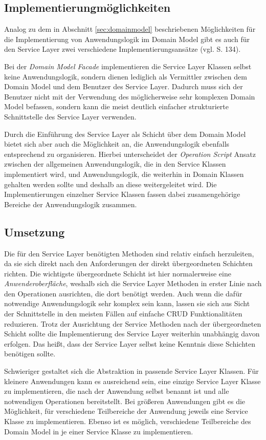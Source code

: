\subsection{Implementierungmöglichkeiten}
Analog zu dem in Abschnitt \ref{sec:domainmodel} beschriebenen Möglichkeiten für
die Implementierung von Anwendungslogik im Domain Model gibt es auch für den
Service Layer zwei verschiedene Implementierungsansätze (vgl.
\cite{fowler:2002} S. 134).

Bei der \emph{Domain Model Facade} implementieren die Service Layer Klassen
selbst keine Anwendungslogik, sondern dienen lediglich als Vermittler zwischen
dem Domain Model und dem Benutzer des Service Layer. Dadurch muss sich der
Benutzer nicht mit der Verwendung des möglicherweise sehr komplexen Domain Model
befassen, sondern kann die meist deutlich einfacher strukturierte
Schnittstelle des Service Layer verwenden.

Durch die Einführung des Service Layer als Schicht über dem Domain Model bietet
sich aber auch die Möglichkeit an, die Anwendungslogik ebenfalls entsprechend zu
organisieren. Hierbei unterscheidet der \emph{Opera\-tion Script} Ansatz
zwischen der allgemeinen Anwendungslogik, die in den Service Klassen implementiert wird,
und Anwendungslogik, die weiterhin in Domain Klassen gehalten werden sollte und
deshalb an diese weitergeleitet wird. Die Implementierungen einzelner Service
Klassen fassen dabei zusamengehörige Bereiche der Anwendungslogik zusammen.

\subsection{Umsetzung}
Die für den Service Layer benötigten Methoden sind relativ einfach herzuleiten,
da sie sich direkt nach den Anforderungen der direkt übergeordneten Schichten
richten. Die wichtigste übergeordnete Schicht ist hier normalerweise eine
\emph{Anwenderoberfläche}, weshalb sich die Service Layer Methoden in erster
Linie nach den Operationen ausrichten, die dort benötigt werden. Auch wenn die
dafür notwendige Anwendungslogik sehr komplex sein kann, lassen sie sich aus
Sicht der Schnittstelle in den meisten Fällen auf einfache \ac{CRUD}
Funktionalitäten reduzieren. Trotz der Ausrichtung der Service Methoden nach der
übergeordneten Schicht sollte die Implementierung des Service Layer weiterhin
unabhängig davon erfolgen. Das heißt, dass der Service Layer selbst keine
Kenntnis diese Schichten benötigen sollte.

Schwieriger gestaltet sich die Abstraktion in passende Service Layer Klassen. Für
kleinere Anwendungen kann es ausreichend sein, eine einzige Service Layer Klasse
zu implementieren, die nach der Anwendung selbst benannt ist und alle notwendigen
Operationen bereitstellt. Bei größeren Anwendungen gibt es die Möglichkeit, für
verschiedene Teilbereiche der Anwendung jeweils eine Service Klasse zu
implementieren. Ebenso ist es möglich, verschiedene Teilbereiche des Domain
Model in je einer Service Klasse zu implementieren.

